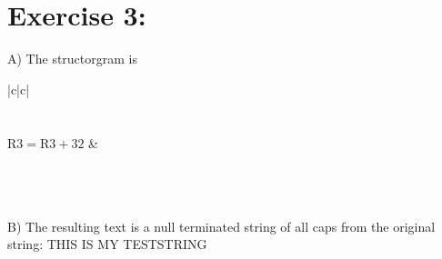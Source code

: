 \section*{Exercise 3:}
A) The structorgram is

\begin{center}
\begin{tabular}{|c|c|}
\hline
{} \\
\hline
{} \\
\hline
{} \\
\hline
$\mathrm{R} 3=\mathrm{R} 3+32$ &  \\
\hline
{} \\
\hline
{} \\
\hline
{} \\
\hline
\end{tabular}
\end{center}

B) The resulting text is a null terminated string of all caps from the original string: THIS IS MY TESTSTRING